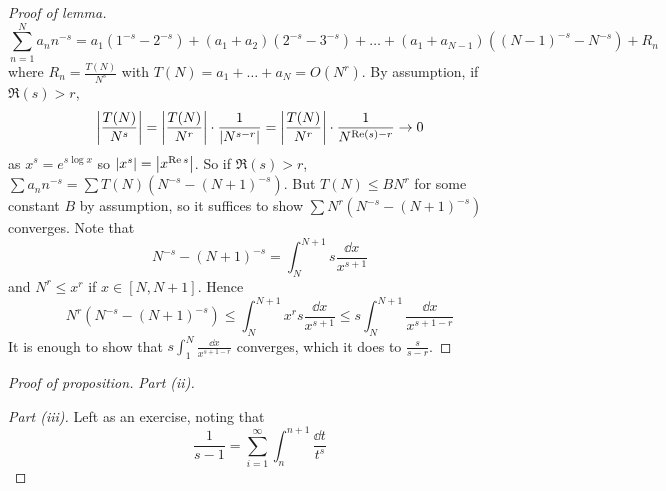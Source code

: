 \begin{proof}[Proof of lemma]
    \[ \sum_{n=1}^N a_n n^{-s} = a_1 (1^{-s} - 2^{-s}) + (a_1 + a_2) (2^{-s} - 3^{-s}) + \dots + (a_1 + a_{N-1})((N-1)^{-s} - N^{-s}) + R_n \]
    where \( R_n = \frac{T(N)}{N^s} \) with \( T(N) = a_1 + \dots + a_N = O(N^r) \).
    By assumption, if \( \Re(s) > r \),
    \[ \abs{\frac{T(N)}{N^s}} = \abs{\frac{T(N)}{N^r}} \cdot \frac{1}{\abs{N^{s-r}}} = \abs{\frac{T(N)}{N^r}} \cdot \frac{1}{N^{\Re(s) - r}} \to 0 \]
    as \( x^s = e^{s \log x} \) so \( \abs{x^s} = \abs{x^{\Re s}} \).
    So if \( \Re(s) > r \), \( \sum a_n n^{-s} = \sum T(N) (N^{-s} - (N+1)^{-s}) \).
    But \( T(N) \leq BN^r \) for some constant \( B \) by assumption, so it suffices to show \( \sum N^r (N^{-s} - (N+1)^{-s}) \) converges.
    Note that
    \[ N^{-s} - (N+1)^{-s} = \int_N^{N+1} s \frac{\dd{x}}{x^{s+1}} \]
    and \( N^r \leq x^r \) if \( x \in [N, N+1] \).
    Hence
    \[ N^r (N^{-s} - (N+1)^{-s}) \leq \int_N^{N+1} x^r s \frac{\dd{x}}{x^{s+1}} \leq s \int_N^{N+1} \frac{\dd{x}}{x^{s+1-r}} \]
    It is enough to show that \( s\int_1^N \frac{\dd{x}}{x^{s+1-r}} \) converges, which it does to \( \frac{s}{s-r} \).
\end{proof}
\begin{proof}[Proof of proposition]
    \emph{Part (ii).}

    \emph{Part (iii).}
    Left as an exercise, noting that
    \[ \frac{1}{s-1} = \sum_{i=1}^\infty \int_n^{n+1} \frac{\dd{t}}{t^s} \]
\end{proof}

